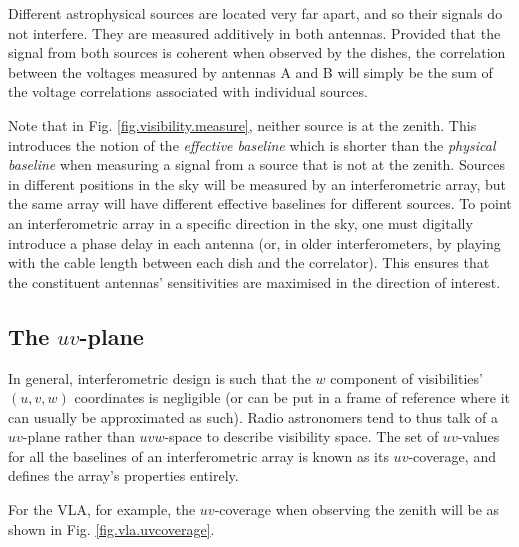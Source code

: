 \pg
Different astrophysical sources are located very far apart, and so their signals do not interfere. They are measured additively in both antennas. Provided that the signal from both sources is coherent when observed by the dishes, the correlation between the voltages measured by antennas A and B will simply be the sum of the voltage correlations associated with individual sources. %

\pg
Note that in Fig. \ref{fig.visibility.measure}, neither source is at the zenith. This introduces the notion of the \emph{effective baseline} which is shorter than the \emph{physical baseline} when measuring a signal from a source that is not at the zenith. Sources in different positions in the sky will be measured by an interferometric array, but the same array will have different effective baselines for different sources. To point an interferometric array in a specific direction in the sky, one must digitally introduce a phase delay in each antenna (or, in older interferometers, by playing with the cable length between each dish and the correlator). This ensures that the constituent antennas' sensitivities are maximised in the direction of interest.

\subsection{The $uv$-plane}

\pg
In general, interferometric design is such that the $w$ component of visibilities' $(u,v,w)$ coordinates is negligible (or can be put in a frame of reference where it can usually be approximated as such). Radio astronomers tend to thus talk of a $uv$-plane rather than $uvw$-space to describe visibility space. The set of $uv$-values for all the baselines of an interferometric array is known as its $uv$-coverage, and defines the array's properties entirely.

\pg
For the VLA, for example, the $uv$-coverage when observing the zenith will be as shown in Fig. \ref{fig.vla.uvcoverage}.

